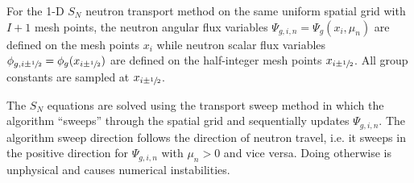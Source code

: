 For the 1-D $S_N$ neutron transport method on the same uniform spatial grid with $I+1$ mesh points,
the neutron angular flux variables $\Psi_{g,i,n}=\Psi_g(x_i,\mu_n)$ are defined on the mesh points
$x_i$ while neutron scalar flux variables $\phi_{g,i\pm\sfrac{1}{2}}=\phi_g(x_{i\pm\sfrac{1}{2}})$
are defined on the half-integer mesh points $x_{i\pm\sfrac{1}{2}}$. All group constants are sampled
at $x_{i\pm\sfrac{1}{2}}$.

The $S_N$ equations are solved using the transport sweep method in which the algorithm ``sweeps''
through the spatial grid and sequentially updates $\Psi_{g,i,n}$. The algorithm sweep
direction follows the direction of neutron travel, i.e. it sweeps in the positive direction for
$\Psi_{g,i,n}$ with $\mu_n>0$ and vice versa. Doing otherwise is unphysical and causes numerical
instabilities.

